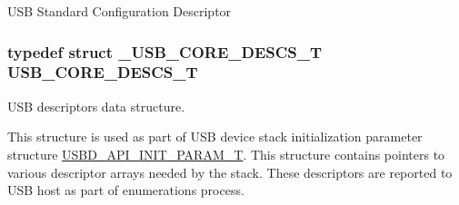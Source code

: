 U\-S\-B Standard Configuration Descriptor \hypertarget{group__USBD__Core_gabdc617d119eac0555f91bea957c41ecc}{
\subsubsection[{U\-S\-B\-\_\-\-C\-O\-R\-E\-\_\-\-D\-E\-S\-C\-S\-\_\-\-T}]{\setlength{\rightskip}{0pt plus 5cm}typedef struct {\bf \-\_\-\-U\-S\-B\-\_\-\-C\-O\-R\-E\-\_\-\-D\-E\-S\-C\-S\-\_\-\-T}  {\bf U\-S\-B\-\_\-\-C\-O\-R\-E\-\_\-\-D\-E\-S\-C\-S\-\_\-\-T}}}\label{group__USBD__Core_gabdc617d119eac0555f91bea957c41ecc}


U\-S\-B descriptors data structure. 

This structure is used as part of U\-S\-B device stack initialization parameter structure \hyperlink{group__USBD__Core_gaa6e8171941c1ae63afed95974e0f18e3}{U\-S\-B\-D\-\_\-\-A\-P\-I\-\_\-\-I\-N\-I\-T\-\_\-\-P\-A\-R\-A\-M\-\_\-\-T}. This structure contains pointers to various descriptor arrays needed by the stack. These descriptors are reported to U\-S\-B host as part of enumerations process.

